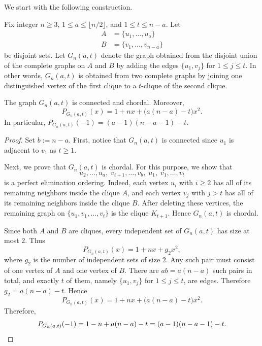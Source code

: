 \documentclass[12pt]{amsart}
\theoremstyle{plain}
\theoremstyle{definition}
\begin{document}
We start with the following construction.


\begin{defn}\label{defn:chordal_two_clique_family}
Fix integer \(n\geq 3\), \(1\leq a\leq \lfloor n/2\rfloor\), and \(1\leq t\leq n-a\).
Let
\begin{align*}
  A&=\{u_1,\dots,u_a\}\\
B&=\{v_1,\dots,v_{n-a}\}  
\end{align*}
be disjoint sets. Let \(G_n(a,t)\) denote the graph obtained from the disjoint union
of the complete graphs on \(A\) and \(B\) by adding the edges $\{u_1,v_j\}$ for $1\leq j\leq t$. In other words, \(G_n(a,t)\) is obtained from two complete graphs by joining one
distinguished vertex of the first clique to a \(t\)-clique of the second clique.
\end{defn}

\begin{prop}\label{prop:chordal_two_clique_value}
The graph \(G_n(a,t)\) is connected and chordal. Moreover,
\[
P_{G_n(a,t)}(x)=1+nx+\bigl(a(n-a)-t\bigr)x^2.
\]
In particular, \(P_{G_n(a,t)}(-1)=(a-1)(n-a-1)-t\).
\end{prop}

\begin{proof}
Set \(b:=n-a\). First, notice that
\(G_n(a,t)\) is connected since \(u_1\) is adjacent to \(v_1\) as $t\ge 1$.  

Next, we prove that $G_n(a,t)$ is chordal. For this purpose, we show that
\[
u_2,\dots,u_a,\; v_{t+1},\dots,v_b,\; u_1,\; v_1,\dots,v_t
\]
is a perfect elimination ordering. Indeed, each vertex \(u_i\) with \(i\geq 2\)
has all of its remaining neighbors inside the clique \(A\), and each vertex \(v_j\)
with \(j>t\) has all of its remaining neighbors inside the clique \(B\).
After deleting these vertices, the remaining graph on
\(\{u_1,v_1,\dots,v_t\}\) is the clique \(K_{t+1}\). Hence \(G_n(a,t)\) is chordal.

Since both \(A\) and \(B\) are cliques, every independent set of \(G_n(a,t)\)
has size at most \(2\). Thus
\[
P_{G_n(a,t)}(x)=1+nx+g_2x^2,
\]
where \(g_2\) is the number of independent sets of size \(2\). Any such pair must
consist of one vertex of \(A\) and one vertex of \(B\). There are \(ab=a(n-a)\)
such pairs in total, and exactly \(t\) of them, namely
\(\{u_1,v_j\}\) for \(1\leq j\leq t\), are edges. Therefore $g_2=a(n-a)-t$. Hence
\[
P_{G_n(a,t)}(x)=1+nx+\bigl(a(n-a)-t\bigr)x^2.
\]
Therefore,
\[
P_{G_n(a,t)}(-1)=1-n+a(n-a)-t=(a-1)(n-a-1)-t. \qedhere
\]
\end{proof}
\end{document}
